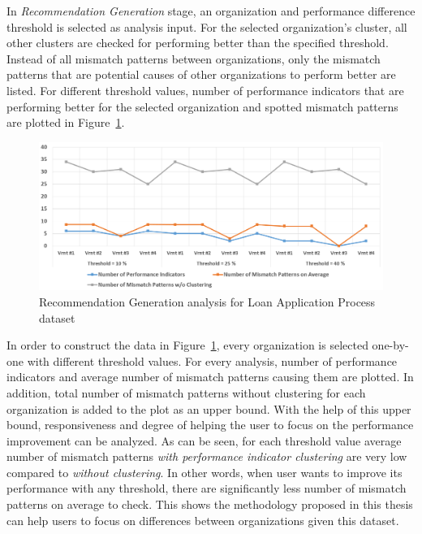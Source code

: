 In \textit{Recommendation Generation} stage, an organization and performance difference threshold is selected as analysis input. For the selected organization's cluster, all other clusters are checked for performing better than the specified threshold. Instead of all mismatch patterns between organizations, only the mismatch patterns that are potential causes of other organizations to perform better are listed. For different threshold values, number of performance indicators that are performing better for the selected organization and spotted mismatch patterns are plotted in Figure~\ref{fig:loan-recommendation-generation-analysis}. 
\begin{figure}
	\centering
	\includegraphics[width=\textwidth]{5_results_discussions/loan-application-process/recommendation-generation-analysis}
	\caption{Recommendation Generation analysis for Loan Application Process dataset}
  \label{fig:loan-recommendation-generation-analysis}
\end{figure}

In order to construct the data in Figure~\ref{fig:loan-recommendation-generation-analysis}, every organization is selected one-by-one with different threshold values. For every analysis, number of performance indicators and average number of mismatch patterns causing them are plotted. In addition, total number of mismatch patterns without clustering for each organization is added to the plot as an upper bound. With the help of this upper bound, responsiveness and degree of helping the user to focus on the performance improvement can be analyzed. As can be seen, for each threshold value average number of mismatch patterns \textit{with performance indicator clustering} are very low compared to \textit{without clustering}. In other words, when user wants to improve its performance with any threshold, there are significantly less number of mismatch patterns on average to check. This shows the methodology proposed in this thesis can help users to focus on differences between organizations given this dataset. 